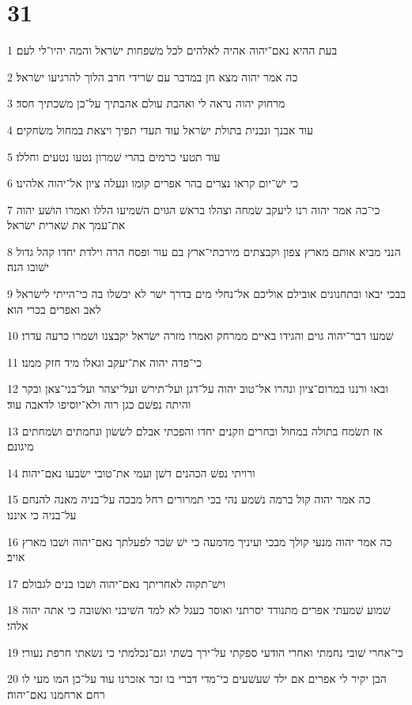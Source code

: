 \chapter{31}

\par 1 בעת ההיא נאם־יהוה אהיה לאלהים לכל משׁפחות ישׂראל והמה יהיו־לי לעם׃
\par 2 כה אמר יהוה מצא חן במדבר עם שׂרידי חרב הלוך להרגיעו ישׂראל׃
\par 3 מרחוק יהוה נראה לי ואהבת עולם אהבתיך על־כן משׁכתיך חסד׃
\par 4 עוד אבנך ונבנית בתולת ישׂראל עוד תעדי תפיך ויצאת במחול משׂחקים׃
\par 5 עוד תטעי כרמים בהרי שׁמרון נטעו נטעים וחללו׃
\par 6 כי ישׁ־יום קראו נצרים בהר אפרים קומו ונעלה ציון אל־יהוה אלהינו׃
\par 7 כי־כה אמר יהוה רנו ליעקב שׂמחה וצהלו בראשׁ הגוים השׁמיעו הללו ואמרו הושׁע יהוה את־עמך את שׁארית ישׂראל׃
\par 8 הנני מביא אותם מארץ צפון וקבצתים מירכתי־ארץ בם עור ופסח הרה וילדת יחדו קהל גדול ישׁובו הנה׃
\par 9 בבכי יבאו ובתחנונים אובילם אוליכם אל־נחלי מים בדרך ישׁר לא יכשׁלו בה כי־הייתי לישׂראל לאב ואפרים בכרי הוא׃
\par 10 שׁמעו דבר־יהוה גוים והגידו באיים ממרחק ואמרו מזרה ישׂראל יקבצנו ושׁמרו כרעה עדרו׃
\par 11 כי־פדה יהוה את־יעקב וגאלו מיד חזק ממנו׃
\par 12 ובאו ורננו במרום־ציון ונהרו אל־טוב יהוה על־דגן ועל־תירשׁ ועל־יצהר ועל־בני־צאן ובקר והיתה נפשׁם כגן רוה ולא־יוסיפו לדאבה עוד׃
\par 13 אז תשׂמח בתולה במחול ובחרים וזקנים יחדו והפכתי אבלם לשׂשׂון ונחמתים ושׂמחתים מיגונם׃
\par 14 ורויתי נפשׁ הכהנים דשׁן ועמי את־טובי ישׂבעו נאם־יהוה׃
\par 15 כה אמר יהוה קול ברמה נשׁמע נהי בכי תמרורים רחל מבכה על־בניה מאנה להנחם על־בניה כי איננו׃
\par 16 כה אמר יהוה מנעי קולך מבכי ועיניך מדמעה כי ישׁ שׂכר לפעלתך נאם־יהוה ושׁבו מארץ אויב׃
\par 17 וישׁ־תקוה לאחריתך נאם־יהוה ושׁבו בנים לגבולם׃
\par 18 שׁמוע שׁמעתי אפרים מתנודד יסרתני ואוסר כעגל לא למד השׁיבני ואשׁובה כי אתה יהוה אלהי׃
\par 19 כי־אחרי שׁובי נחמתי ואחרי הודעי ספקתי על־ירך בשׁתי וגם־נכלמתי כי נשׂאתי חרפת נעורי׃
\par 20 הבן יקיר לי אפרים אם ילד שׁעשׁעים כי־מדי דברי בו זכר אזכרנו עוד על־כן המו מעי לו רחם ארחמנו נאם־יהוה׃
